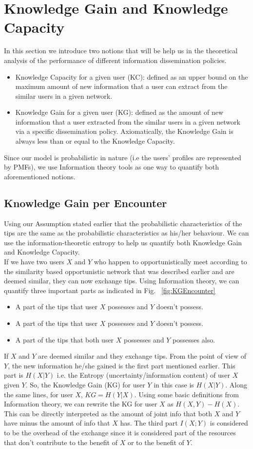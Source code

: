 \documentclass[11pt]{article}
\begin{document}
\section{Knowledge Gain and Knowledge Capacity}
In this section we introduce two notions that will be help us in the theoretical analysis of the performance of different information dissemination policies.
\begin{itemize}
\item Knowledge Capacity for a given user (KC): defined as an upper bound on the maximum amount of new information that a user can extract from the similar users in a given network.
\item Knowledge Gain for a given user (KG): defined as the amount of new information that a user extracted from the similar users in a given network via a specific dissemination policy. Axiomatically, the Knowledge Gain is always less than or equal to the Knowledge Capacity.
\end{itemize}
Since our model is probabilistic in nature (i.e the users' profiles are represented by PMFs), we use Information theory tools as one way to quantify both aforementioned notions.
\subsection{Knowledge Gain per Encounter}
Using our Assumption stated earlier that the probabilistic characteristics of the tips are the same as the probabilistic characteristics as his/her behaviour. We can use the information-theoretic entropy to help us quantify both Knowledge Gain and Knowledge Capacity.\\
If we have two users $X$ and $Y$ who happen to opportunistically meet according to the similarity based opportunistic network that was described earlier and are deemed similar, they can now exchange tips.
Using Information theory, we can quantify three important parts as indicated in Fig. ~\ref{fig:KGEncounter}
\begin{itemize}
\item A part of the tips that user $X$ possesses and $Y$ doesn't possess.
\item A part of the tips that user $X$ possesses and $Y$ doesn't possess.
\item A part of the tips that both user $X$ possesses and $Y$ possesses also.
\end{itemize}
If $X$ and $Y$ are deemed similar and they exchange tips. From the point of view of $Y$, the new information he/she gained is the first part mentioned earlier. This part is $H(X|Y)$ i.e. the Entropy (uncertainty/information content) of user $X$ given $Y$. So, the Knowledge Gain (KG) for user $Y$ in this case is $H(X|Y)$. Along the same lines, for user $X$, $KG=H(Y|X)$.
Using some basic definitions from Information theory, we can rewrite the KG for user $X$ as $H(X,Y)-H(X)$. This can be directly interpreted as the amount of joint info that both $X$ and $Y$ have minus the amount of info that $X$ has.
The third part $I(X;Y)$ is considered to be the overhead of the exchange since it is considered part of the resources that don't contribute to the benefit of $X$ or to the benefit of $Y$.
\end{document}
